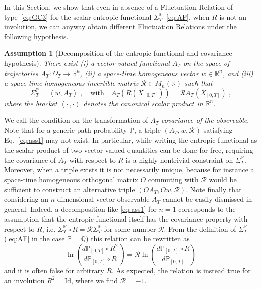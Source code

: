 \documentclass[a4paper,11pt]{article}
\numberwithin{equation}{section}
\newtheorem{assumption}[theorem]{Assumption}
\begin{document}
In this Section, we show that even in absence of a 
Fluctuation Relation of type~\eqref{eq:GC3} for the scalar entropic functional $\varSigma_{T}^{\mathbb{P}}$~\eqref{eq:AF},
 when $R$ is not an involution, we can anyway
obtain different Fluctuation Relations under the following hypothesis. 
\begin{assumption}[Decomposition of the entropic functional and covariance hypothesis]\label{ass}
There exist (i) a vector-valued functional $A_T$ on the space of trajectories $A_T : \Omega_T \to \mathbb{R}^n$, (ii) a space-time homogeneous vector $w \in \mathbb{R}^n$, and (iii) a space-time homogeneous invertible matrix $\mathcal{R} \in M_n(\mathbb{R})$ such that
\begin{equation}\label{eq:ass1}
   \varSigma_{T}^{\mathbb{P}}=\left\langle w, A_T\right\rangle \; , \quad \text{with}  \quad A_T\left(R\left(X_{\left[0,T\right]}\right)\right)=\mathcal{R}A_T\left(X_{\left[0,T\right]}\right) \;,
\end{equation}
where the bracket $ \left\langle \cdot \, ,\cdot \right\rangle$ denotes the canonical
scalar product in $\mathbb{R}^{n}$.
\end{assumption}

We call the condition on the transformation of $A_T$ \emph{covariance of the observable}.
Note that for a generic path probability $\mathbb{P}$, a triple $(A_T, w, \mathcal{R})$ satisfying Eq.~\eqref{eq:ass1} may not exist. In particular, while writing the entropic functional as the scalar product of two vector-valued quantities can be done for free, requiring the covariance of $A_T$ with respect to $R$ is a highly nontrivial constraint on $\varSigma_{T}^{\mathbb{P}}$. Moreover, when a triple exists it is not necessarily unique, because for instance a space-time homogeneous orthogonal matrix $O$ commuting with $\mathcal{R}$ would be sufficient to construct an alternative triple $( O A_T, O w, \mathcal{R})$. 
Note finally that considering an $n$-dimensional vector observable $A_T$ cannot be easily dismissed in general. Indeed, a decomposition like \eqref{eq:ass1} for $n=1$ corresponds to the assumption that the entropic functional itself has the covariance property with respect to $R$, i.e. 
$\varSigma_{T}^{\mathbb{P}}\circ R=\mathcal{R}\varSigma_{T}^{\mathbb{P}}$ for some number $\mathcal{R}$. From the definition of $\varSigma_{T}^{\mathbb{P}}$ (\eqref{eq:AF} in the case $\mathbb{P}=\mathbb{Q}$) this relation can be rewritten as
$$\ln\left(\frac{d\mathbb{P}_{\left[0,T\right]}\circ R^{2}}{d\mathbb{P}_{\left[0,T\right]}\circ
R}\right)=\mathcal{R}\ln\left(\frac{d\mathbb{P}_{\left[0,T\right]}\circ R}{d\mathbb{P}_{\left[0,T\right]}}\right)$$
and it is often false for arbitrary $R$.
As expected, the relation is instead true for an involution $R^{2}=\mathrm{Id}$, where we find $\mathcal{R}=-1.$
\end{document}
